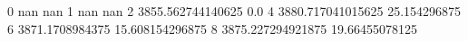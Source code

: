 0 nan nan
1 nan nan
2 3855.562744140625 0.0
4 3880.717041015625 25.154296875
6 3871.1708984375 15.608154296875
8 3875.227294921875 19.66455078125
